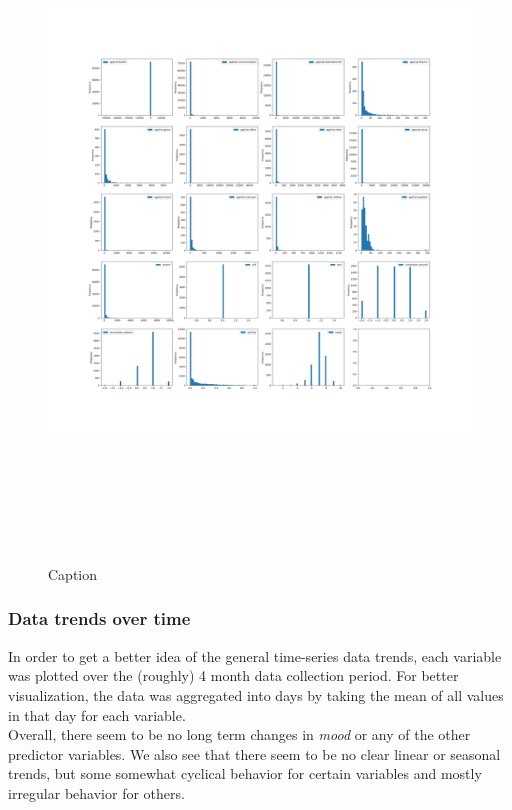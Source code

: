 \documentclass[runningheads]{llncs}
\begin{document}
\begin{figure}[h!]
    \centering
    \includegraphics[width=18cm, height=18cm, trim={10cm 5cm 0 5cm}]{plots/plots_1a/distribution_plot.png}
    \caption{Caption}
    \label{fig:my_label}
\end{figure}


\subsubsection{Data trends over time}
\phantom
\smallskip

In order to get a better idea of the general time-series data trends, each variable was plotted over the (roughly) 4 month data collection period. For better visualization, the data was aggregated into days by taking the mean of all values in that day for each variable. \\

Overall, there seem to be no long term changes in \textit{mood} or any of the other predictor variables. We also see that there seem to be no clear linear or seasonal trends, but some somewhat cyclical behavior for certain variables and mostly irregular behavior for others. \\
\end{document}
